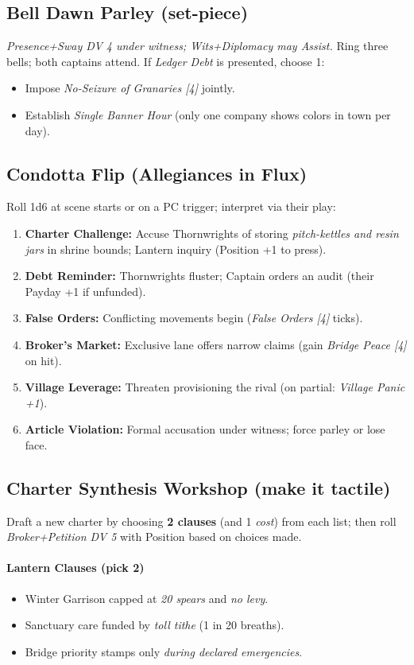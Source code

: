 \documentclass[11pt]{article}
\begin{document}
\subsection*{Bell Dawn Parley (set-piece)}
\emph{Presence+Sway DV 4 under witness; Wits+Diplomacy may Assist.} Ring three bells; both captains attend. If \emph{Ledger Debt} is presented, choose 1:
\begin{itemize}[leftmargin=*]
  \item Impose \emph{No-Seizure of Granaries [4]} jointly.
  \item Establish \emph{Single Banner Hour} (only one company shows colors in town per day).
\end{itemize}

\subsection*{Condotta Flip (Allegiances in Flux)}
Roll 1d6 at scene starts or on a PC trigger; interpret via their play:
\begin{enumerate}[leftmargin=\textit{,label=\Alph}.]
  \item \textbf{Charter Challenge:} Accuse Thornwrights of storing \emph{pitch-kettles and resin jars} in shrine bounds; Lantern inquiry (Position +1 to press).
  \item \textbf{Debt Reminder:} Thornwrights fluster; Captain orders an audit (their Payday +1 if unfunded).
  \item \textbf{False Orders:} Conflicting movements begin (\emph{False Orders [4]} ticks).
  \item \textbf{Broker's Market:} Exclusive lane offers narrow claims (gain \emph{Bridge Peace [4]} on hit).
  \item \textbf{Village Leverage:} Threaten provisioning the rival (on partial: \emph{Village Panic +1}).
  \item \textbf{Article Violation:} Formal accusation under witness; force parley or lose face.
\end{enumerate}

\subsection*{Charter Synthesis Workshop (make it tactile)}
Draft a new charter by choosing \textbf{2 clauses} (and 1 \emph{cost}) from each list; then roll \emph{Broker+Petition DV 5} with Position based on choices made.
\paragraph{Lantern Clauses (pick 2)}
\begin{itemize}[leftmargin=*]
  \item Winter Garrison capped at \emph{20 spears} and \emph{no levy}.
  \item Sanctuary care funded by \emph{toll tithe} (1 in 20 breaths).
  \item Bridge priority stamps only \emph{during declared emergencies}.
\end{itemize}
\end{document}
